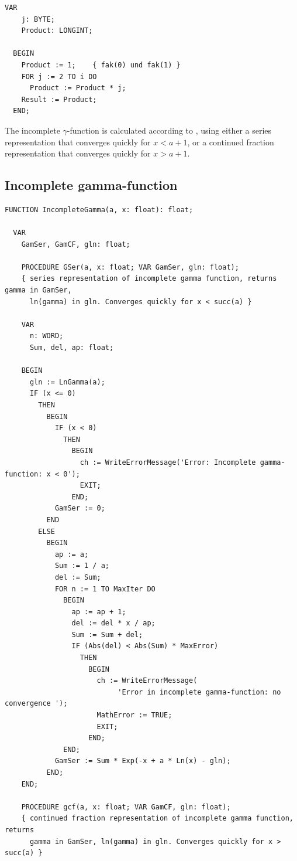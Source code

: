 \begin{refsection}
\begin{lstlisting}[caption=faculties (iterative)]
  VAR
    j: BYTE;
    Product: LONGINT;

  BEGIN
    Product := 1;    { fak(0) und fak(1) }
    FOR j := 2 TO i DO
      Product := Product * j;
    Result := Product;
  END;
\end{lstlisting}

The incomplete \( \gamma \)-function is calculated according to \parencite[p. 182]{Pre-89}, using either a series representation that converges quickly for \(x < a+1 \), or a continued fraction representation that converges quickly for \(x > a+1 \).

\subsection{Incomplete gamma-function}

\begin{lstlisting}[caption=Incomplete gamma function]
  FUNCTION IncompleteGamma(a, x: float): float;

  VAR
    GamSer, GamCF, gln: float;

    PROCEDURE GSer(a, x: float; VAR GamSer, gln: float);
    { series representation of incomplete gamma function, returns gamma in GamSer,
      ln(gamma) in gln. Converges quickly for x < succ(a) }

    VAR
      n: WORD;
      Sum, del, ap: float;

    BEGIN
      gln := LnGamma(a);
      IF (x <= 0)
        THEN
          BEGIN
            IF (x < 0)
              THEN
                BEGIN
                  ch := WriteErrorMessage('Error: Incomplete gamma-function: x < 0');
                  EXIT;
                END;
            GamSer := 0;
          END
        ELSE
          BEGIN
            ap := a;
            Sum := 1 / a;
            del := Sum;
            FOR n := 1 TO MaxIter DO
              BEGIN
                ap := ap + 1;
                del := del * x / ap;
                Sum := Sum + del;
                IF (Abs(del) < Abs(Sum) * MaxError)
                  THEN
                    BEGIN
                      ch := WriteErrorMessage(
                           'Error in incomplete gamma-function: no convergence ');
                      MathError := TRUE;
                      EXIT;
                    END;
              END;
            GamSer := Sum * Exp(-x + a * Ln(x) - gln);
          END;
    END;

    PROCEDURE gcf(a, x: float; VAR GamCF, gln: float);
    { continued fraction representation of incomplete gamma function, returns
      gamma in GamSer, ln(gamma) in gln. Converges quickly for x > succ(a) }


\end{lstlisting}
\end{refsection}
